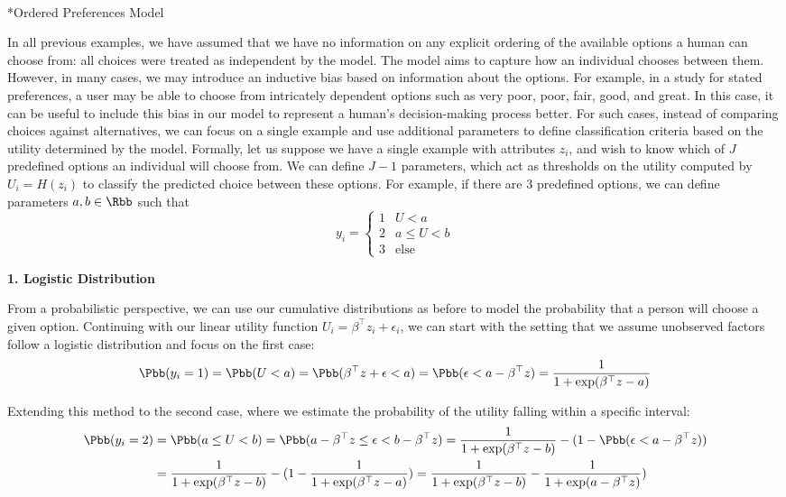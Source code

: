 \documentclass[
  letterpaper,
  DIV=11,
  numbers=noendperiod,
  oneside]{scrreprt}
\makeatletter
\let\oldparagraph\paragraph
\renewcommand{\paragraph}{
    \@ifstar
      \xxxParagraphStar
      \xxxParagraphNoStar
  }
\newcommand{\xxxParagraphStar}[1]{\oldparagraph*{#1}\mbox{}}
\newcommand{\xxxParagraphNoStar}[1]{\oldparagraph{#1}\mbox{}}
\theoremstyle{remark}
\makeatother
\begin{document}
\paragraph*{Ordered Preferences Model}\label{ordered-preferences-model}

In all previous examples, we have assumed that we have no information on
any explicit ordering of the available options a human can choose from:
all choices were treated as independent by the model. The model aims to
capture how an individual chooses between them. However, in many cases,
we may introduce an inductive bias based on information about the
options. For example, in a study for stated preferences, a user may be
able to choose from intricately dependent options such as very poor,
poor, fair, good, and great. In this case, it can be useful to include
this bias in our model to represent a human's decision-making process
better. For such cases, instead of comparing choices against
alternatives, we can focus on a single example and use additional
parameters to define classification criteria based on the utility
determined by the model. Formally, let us suppose we have a single
example with attributes \(z_i\), and wish to know which of \(J\)
predefined options an individual will choose from. We can define
\(J - 1\) parameters, which act as thresholds on the utility computed by
\(U_i = H(z_i)\) to classify the predicted choice between these options.
For example, if there are 3 predefined options, we can define parameters
\(a, b \in \Rbb\) such that \[y_i = \begin{cases} 
      1 & U < a \\
      2 & a \le U < b \\
      3 & \text{else}
   \end{cases}\]

\textbf{1. Logistic Distribution}

From a probabilistic perspective, we can use our cumulative
distributions as before to model the probability that a person will
choose a given option. Continuing with our linear utility function
\(U_i = \beta^\top z_i + \epsilon_i\), we can start with the setting
that we assume unobserved factors follow a logistic distribution and
focus on the first case:
\[\Pbb(y_i = 1) = \Pbb(U < a) = \Pbb(\beta^\top z + \epsilon < a )  = \Pbb( \epsilon < a - \beta^\top z)  = \frac{1}{1 + \exp(\beta^\top z - a)}\]

Extending this method to the second case, where we estimate the
probability of the utility falling within a specific interval:
\[\begin{aligned}
    \Pbb(y_i = 2) & = \Pbb(a \le U < b) = \Pbb(a - \beta^\top z \le \epsilon < b - \beta^\top z) = \frac{1}{1 + \exp(\beta^\top z - b)}  - (1 - \Pbb( \epsilon < a - \beta^\top z) ) \\
    & = \frac{1}{1 + \exp(\beta^\top z - b)}  - (1 - \frac{1}{1 + \exp(\beta^\top z - a)}  ) = \frac{1}{1 + \exp(\beta^\top z - b)}  - \frac{1}{1 + \exp(a - \beta^\top z)}  ) \\
\end{aligned}\]
\end{document}
